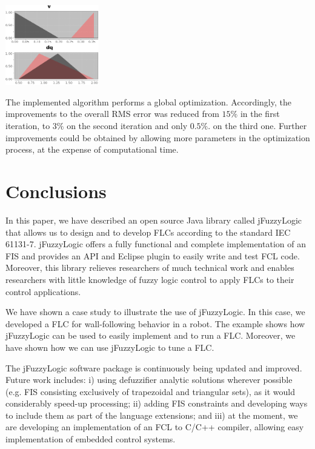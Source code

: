 \documentclass[11pt,twoside]{article}
\begin{document}
\begin{multicols}{2}
\vspace*{7pt}
\centerline{\includegraphics[width=1.6in]{./figs/optimization_iter_4.png}}
\vspace*{2pt}
\label{f:optimization_iter_4}
\vspace*{4pt}

The implemented algorithm performs a global optimization. Accordingly, the improvements to the overall RMS error was reduced from $15\%$ in the first iteration, to $3\%$ on the second iteration and only $0.5\%$. on the third one. Further improvements could be obtained by allowing more parameters in the optimization process, at the expense of computational time.
\section{Conclusions}
\label{sec:con}

In this paper, we have described an open source Java library called jFuzzyLogic that allows us to design and to develop FLCs according to the standard IEC 61131-7. jFuzzyLogic offers a fully functional and complete implementation of an FIS and provides an API and Eclipse plugin to easily write and test FCL code. Moreover,  this library relieves researchers of much technical work and enables researchers with little knowledge of fuzzy logic control to apply FLCs to their control applications.

We have shown a case study to illustrate the use of jFuzzyLogic. In this case, we developed a FLC for wall-following behavior in a robot. The example shows how jFuzzyLogic can be used to easily implement and to run a FLC. Moreover, we have shown how we can use jFuzzyLogic to tune a FLC.

The jFuzzyLogic software package is continuously being updated and improved. 
Future work includes: 
	i) using defuzzifier analytic solutions wherever possible (e.g. FIS consisting exclusively of trapezoidal and triangular sets), as it would considerably speed-up processing; 
	ii) adding FIS constraints and developing ways to include them as part of the language extensions; and
	iii) at the moment, we are developing an implementation of an FCL to C/C++ compiler, allowing easy implementation of embedded control systems.


\end{multicols}
\end{document}
